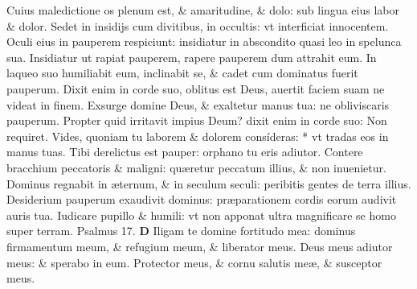 \documentclass[a5paper,10pt]{book}
\def\ae{æ}
\begin{document}
\begin{multicols*}{2}
\newline \color{red} C\color{black}uius maledictione os plenum est, \& amaritudine, \& dolo: sub lingua eius labor \& dolor.
\newline \color{red} S\color{black}edet in insidijs cum divitibus, in occultis: vt interficiat innocentem.
\newline \color{red} O\color{black}culi eius in pauperem respiciunt: insidiatur in abscondito quasi leo in spelunca sua.
\newline \color{red} I\color{black}nsidiatur ut rapiat pauperem, rapere pauperem dum attrahit eum.
\newline \color{red} I\color{black}n laqueo suo humiliabit eum, inclinabit se, \& cadet cum dominatus fuerit pauperum.
\newline \color{red} D\color{black}ixit enim in corde suo, oblitus est Deus, auertit faciem suam ne videat in finem.
\newline \color{red} E\color{black}xsurge domine Deus, \& exaltetur manus tua: ne obliviscaris pauperum.
\newline \color{red} P\color{black}ropter quid irritavit impius Deum? dixit enim in corde suo: Non requiret.
\newline \color{red} V\color{black}ides, quoniam tu laborem \& dolorem consíderas: * vt tradas eos in manus tuas.
\newline \color{red} T\color{black}ibi derelictus est pauper: orphano tu eris adiutor.
\newline \color{red} C\color{black}ontere bracchium peccatoris \& maligni: qu\ae retur peccatum illius, \& non inuenietur.
\newline \color{red} D\color{black}ominus regnabit in \ae ternum, \& in seculum seculi: peribitis gentes de terra illius.
\newline \color{red} D\color{black}esiderium pauperum exaudivit dominus: pr\ae parationem cordis eorum audivit auris tua.
\newline \color{red} I\color{black}udicare pupillo \& humili: vt non apponat ultra magnificare se homo super terram. \quad \color{red} Psalmus 17. \color{black}
\vspace{-1em}
\lettrine[lines=2]{\bfseries \color{red} D}{}
Iligam te domine fortitudo mea: dominus firmamentum meum, \& refugium meum, \& liberator meus.
\newline \color{red} D\color{black}eus meus adiutor meus: \& sperabo in eum.
\newline \color{red} P\color{black}rotector meus, \& cornu salutis me\ae , \& susceptor meus.

\end{multicols*}
\end{document}
